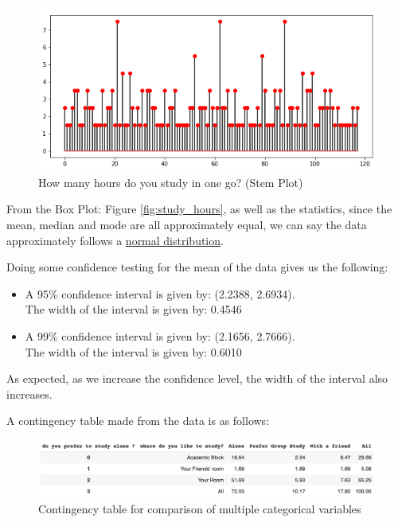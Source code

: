 \documentclass[12pt,onecolumn,letterpaper]{article}
\begin{document}
\begin{figure}
    \centering
    \includegraphics[scale=0.7]{output3.2.png}
    \caption{How many hours do you study in one go? (Stem Plot)}
    \label{fig:my_label}
\end{figure}

\hspace{0.3in} From the Box Plot: Figure \ref{fig:study_hours}, as well as the statistics, since the mean, median and mode are all approximately equal, we can say the data approximately follows a \underline{normal distribution}.\\
\vspace{5cm}

\hspace{0.3in} Doing some confidence testing for the mean of the data gives us the following:
\begin{itemize}
    \item A 95\% confidence interval is given by: (2.2388, 2.6934). \\The width of the interval is given by: 0.4546
    \item A 99\% confidence interval is given by: (2.1656, 2.7666). \\The width of the interval is given by: 0.6010
\end{itemize}

As expected, as we increase the confidence level, the width of the interval also increases. 
\newpage

A contingency table made from the data is as follows:
\begin{figure}[h]
    \centering
    \includegraphics[scale=0.45]{output6.png}
    \caption{Contingency table for comparison of multiple categorical variables}
    \label{fig:contingency_table}
\end{figure}
\end{document}

